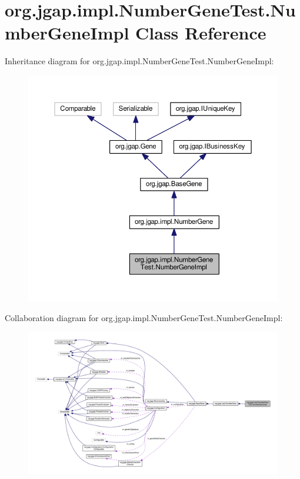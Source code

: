 \hypertarget{classorg_1_1jgap_1_1impl_1_1_number_gene_test_1_1_number_gene_impl}{\section{org.\-jgap.\-impl.\-Number\-Gene\-Test.\-Number\-Gene\-Impl Class Reference}
\label{classorg_1_1jgap_1_1impl_1_1_number_gene_test_1_1_number_gene_impl}
}


Inheritance diagram for org.\-jgap.\-impl.\-Number\-Gene\-Test.\-Number\-Gene\-Impl\-:
\nopagebreak
\begin{figure}[H]
\begin{center}
\leavevmode
\includegraphics[width=350pt]{classorg_1_1jgap_1_1impl_1_1_number_gene_test_1_1_number_gene_impl__inherit__graph}
\end{center}
\end{figure}


Collaboration diagram for org.\-jgap.\-impl.\-Number\-Gene\-Test.\-Number\-Gene\-Impl\-:
\nopagebreak
\begin{figure}[H]
\begin{center}
\leavevmode
\includegraphics[width=350pt]{classorg_1_1jgap_1_1impl_1_1_number_gene_test_1_1_number_gene_impl__coll__graph}
\end{center}
\end{figure}
